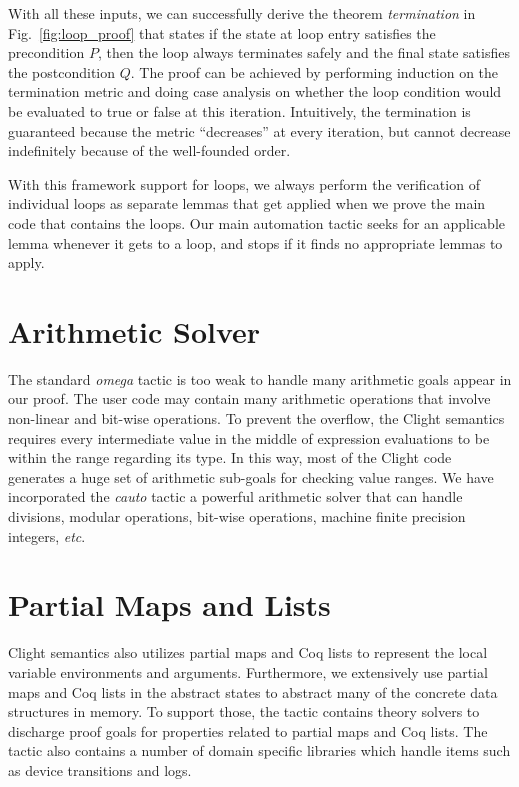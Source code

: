 With all these inputs, we can successfully derive the theorem
{\em termination} in Fig.~\ref{fig:loop_proof} that states
if the state at loop entry satisfies the precondition $P$,
then the loop always terminates safely and the final state
satisfies the postcondition $Q$. The proof can be achieved
by performing induction on the termination metric and doing
case analysis on whether the loop condition would be evaluated
to true or false at this iteration. Intuitively, the termination
is guaranteed because the metric ``decreases'' at every iteration,
but cannot decrease indefinitely because of the well-founded order.

With this framework support for loops, we always perform the verification
of individual loops as separate lemmas that get applied when we prove
the main code that contains the loops. Our main automation tactic
seeks for an applicable lemma whenever it gets to a loop, and stops
if it finds no appropriate lemmas to apply.

\section{Arithmetic Solver}

The standard {\em omega} tactic is too weak to handle many arithmetic
goals appear in our proof. The user code may contain many arithmetic
operations that involve non-linear and bit-wise operations.
To prevent the overflow, the Clight semantics requires every
intermediate value in the middle of expression evaluations to be within the
range regarding its type. In this way, most of the Clight code generates a huge
set of arithmetic sub-goals for checking value ranges. We have incorporated
the {\em cauto} tactic a powerful arithmetic solver that can handle divisions,
modular operations, bit-wise operations, machine finite precision integers, {\it
etc}. 


\section{Partial Maps and Lists}

Clight semantics also utilizes partial maps and Coq lists to represent the local
variable environments and arguments. Furthermore, we extensively use partial
maps and Coq lists in the abstract states to abstract many of the concrete data
structures in memory. To support those, the tactic contains theory solvers to
discharge proof goals for properties related to partial maps and Coq lists. The
tactic also contains a number of domain specific libraries which handle items
such as device transitions and logs.


